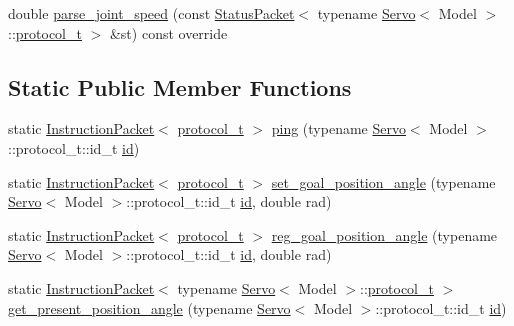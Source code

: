 \begin{DoxyCompactItemize}
\item 
double \hyperlink{classdynamixel_1_1servos_1_1_servo_aecbc3c2ff71bff6af97e1d1d4dbbfffa}{parse\+\_\+joint\+\_\+speed} (const \hyperlink{classdynamixel_1_1_status_packet}{Status\+Packet}$<$ typename \hyperlink{classdynamixel_1_1servos_1_1_servo}{Servo}$<$ Model $>$\+::\hyperlink{classdynamixel_1_1servos_1_1_servo_a7718c41cee1187b992836f4b6bad8a38}{protocol\+\_\+t} $>$ \&st) const override
\end{DoxyCompactItemize}
\subsection*{Static Public Member Functions}
\begin{DoxyCompactItemize}
\item 
static \hyperlink{classdynamixel_1_1_instruction_packet}{Instruction\+Packet}$<$ \hyperlink{classdynamixel_1_1servos_1_1_servo_a7718c41cee1187b992836f4b6bad8a38}{protocol\+\_\+t} $>$ \hyperlink{classdynamixel_1_1servos_1_1_servo_aff70a01c90eddfca6070c0b97237ee60}{ping} (typename \hyperlink{classdynamixel_1_1servos_1_1_servo}{Servo}$<$ Model $>$\+::protocol\+\_\+t\+::id\+\_\+t \hyperlink{classdynamixel_1_1servos_1_1_servo_a2d022081672e25a7bb57b76706e1cc57}{id})
\item 
static \hyperlink{classdynamixel_1_1_instruction_packet}{Instruction\+Packet}$<$ \hyperlink{classdynamixel_1_1servos_1_1_servo_a7718c41cee1187b992836f4b6bad8a38}{protocol\+\_\+t} $>$ \hyperlink{classdynamixel_1_1servos_1_1_servo_aac6fe4f59bd30af81b8f8ecfc11caf9d}{set\+\_\+goal\+\_\+position\+\_\+angle} (typename \hyperlink{classdynamixel_1_1servos_1_1_servo}{Servo}$<$ Model $>$\+::protocol\+\_\+t\+::id\+\_\+t \hyperlink{classdynamixel_1_1servos_1_1_servo_a2d022081672e25a7bb57b76706e1cc57}{id}, double rad)
\item 
static \hyperlink{classdynamixel_1_1_instruction_packet}{Instruction\+Packet}$<$ \hyperlink{classdynamixel_1_1servos_1_1_servo_a7718c41cee1187b992836f4b6bad8a38}{protocol\+\_\+t} $>$ \hyperlink{classdynamixel_1_1servos_1_1_servo_ae500d1911ed8bf356b54b6d8d288a316}{reg\+\_\+goal\+\_\+position\+\_\+angle} (typename \hyperlink{classdynamixel_1_1servos_1_1_servo}{Servo}$<$ Model $>$\+::protocol\+\_\+t\+::id\+\_\+t \hyperlink{classdynamixel_1_1servos_1_1_servo_a2d022081672e25a7bb57b76706e1cc57}{id}, double rad)
\item 
static \hyperlink{classdynamixel_1_1_instruction_packet}{Instruction\+Packet}$<$ typename \hyperlink{classdynamixel_1_1servos_1_1_servo}{Servo}$<$ Model $>$\+::\hyperlink{classdynamixel_1_1servos_1_1_servo_a7718c41cee1187b992836f4b6bad8a38}{protocol\+\_\+t} $>$ \hyperlink{classdynamixel_1_1servos_1_1_servo_a164c57e41b366c35c8d1f9d4487415b7}{get\+\_\+present\+\_\+position\+\_\+angle} (typename \hyperlink{classdynamixel_1_1servos_1_1_servo}{Servo}$<$ Model $>$\+::protocol\+\_\+t\+::id\+\_\+t \hyperlink{classdynamixel_1_1servos_1_1_servo_a2d022081672e25a7bb57b76706e1cc57}{id})

\end{DoxyCompactItemize}
